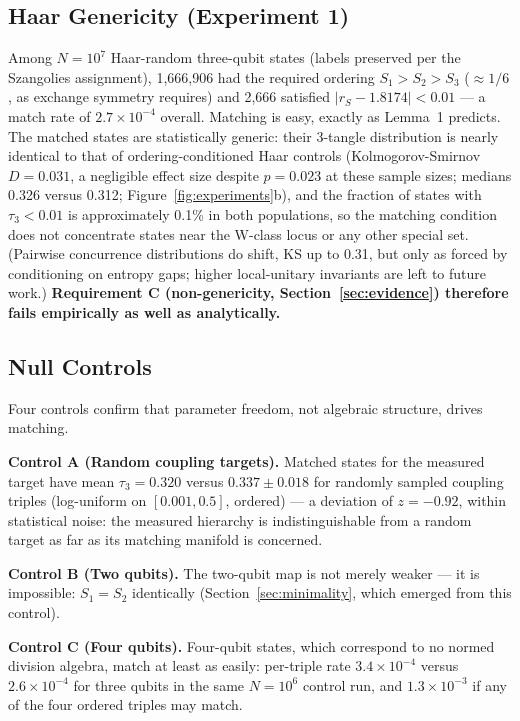 \documentclass[11pt]{article}
\begin{document}
\subsection{Haar Genericity (Experiment 1)}
\label{sec:exp1}

Among $N = 10^7$ Haar-random three-qubit states (labels preserved per the Szangolies assignment), 1{,}666{,}906 had the required ordering $S_1 > S_2 > S_3$ ($\approx 1/6$, as exchange symmetry requires) and 2{,}666 satisfied $|r_S - 1.8174| < 0.01$ --- a match rate of $2.7 \times 10^{-4}$ overall. Matching is easy, exactly as Lemma~1 predicts. The matched states are statistically generic: their 3-tangle \cite{coffman} distribution is nearly identical to that of ordering-conditioned Haar controls (Kolmogorov-Smirnov $D = 0.031$, a negligible effect size despite $p = 0.023$ at these sample sizes; medians 0.326 versus 0.312; Figure~\ref{fig:experiments}b), and the fraction of states with $\tau_3 < 0.01$ is approximately 0.1\% in both populations, so the matching condition does not concentrate states near the W-class locus or any other special set. (Pairwise concurrence distributions do shift, KS up to 0.31, but only as forced by conditioning on entropy gaps; higher local-unitary invariants are left to future work.) \textbf{Requirement C (non-genericity, Section~\ref{sec:evidence}) therefore fails empirically as well as analytically.}

\subsection{Null Controls}
\label{sec:controls}

Four controls confirm that parameter freedom, not algebraic structure, drives matching.

\textbf{Control A (Random coupling targets).} Matched states for the measured target have mean $\tau_3 = 0.320$ versus $0.337 \pm 0.018$ for randomly sampled coupling triples (log-uniform on $[0.001, 0.5]$, ordered) --- a deviation of $z = -0.92$, within statistical noise: the measured hierarchy is indistinguishable from a random target as far as its matching manifold is concerned.

\textbf{Control B (Two qubits).} The two-qubit map is not merely weaker --- it is impossible: $S_1 = S_2$ identically (Section~\ref{sec:minimality}, which emerged from this control).

\textbf{Control C (Four qubits).} Four-qubit states, which correspond to no normed division algebra, match at least as easily: per-triple rate $3.4 \times 10^{-4}$ versus $2.6 \times 10^{-4}$ for three qubits in the same $N = 10^6$ control run, and $1.3 \times 10^{-3}$ if any of the four ordered triples may match.
\end{document}
